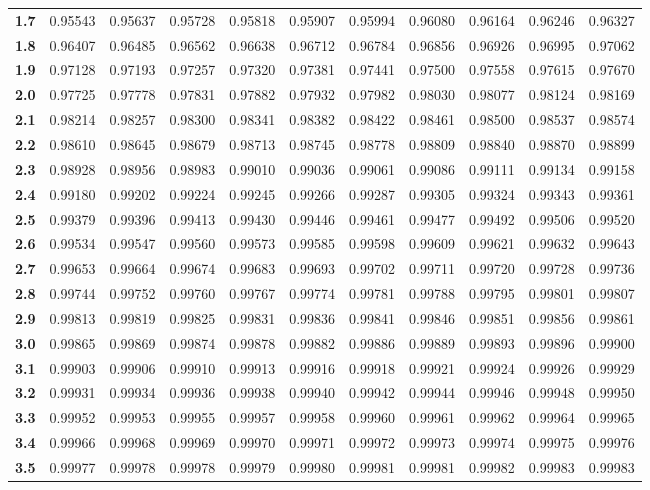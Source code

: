 \documentclass[12pt,a4paper]{article}
\begin{document}
\begin{enumerate}
\begin{center}
\begin{longtable}{c | cccccccccc}
\textbf{1.7} & 0.95543 & 0.95637 & 0.95728 & 0.95818 & 0.95907 & 0.95994 & 0.96080 & 0.96164 & 0.96246 & 0.96327 \\
\textbf{1.8} & 0.96407 & 0.96485 & 0.96562 & 0.96638 & 0.96712 & 0.96784 & 0.96856 & 0.96926 & 0.96995 & 0.97062 \\
\textbf{1.9} & 0.97128 & 0.97193 & 0.97257 & 0.97320 & 0.97381 & 0.97441 & 0.97500 & 0.97558 & 0.97615 & 0.97670 \\
\textbf{2.0} & 0.97725 & 0.97778 & 0.97831 & 0.97882 & 0.97932 & 0.97982 & 0.98030 & 0.98077 & 0.98124 & 0.98169 \\
\textbf{2.1} & 0.98214 & 0.98257 & 0.98300 & 0.98341 & 0.98382 & 0.98422 & 0.98461 & 0.98500 & 0.98537 & 0.98574 \\
\textbf{2.2} & 0.98610 & 0.98645 & 0.98679 & 0.98713 & 0.98745 & 0.98778 & 0.98809 & 0.98840 & 0.98870 & 0.98899 \\
\textbf{2.3} & 0.98928 & 0.98956 & 0.98983 & 0.99010 & 0.99036 & 0.99061 & 0.99086 & 0.99111 & 0.99134 & 0.99158 \\
\textbf{2.4} & 0.99180 & 0.99202 & 0.99224 & 0.99245 & 0.99266 & 0.99287 & 0.99305 & 0.99324 & 0.99343 & 0.99361 \\
\textbf{2.5} & 0.99379 & 0.99396 & 0.99413 & 0.99430 & 0.99446 & 0.99461 & 0.99477 & 0.99492 & 0.99506 & 0.99520 \\
\textbf{2.6} & 0.99534 & 0.99547 & 0.99560 & 0.99573 & 0.99585 & 0.99598 & 0.99609 & 0.99621 & 0.99632 & 0.99643 \\
\textbf{2.7} & 0.99653 & 0.99664 & 0.99674 & 0.99683 & 0.99693 & 0.99702 & 0.99711 & 0.99720 & 0.99728 & 0.99736 \\
\textbf{2.8} & 0.99744 & 0.99752 & 0.99760 & 0.99767 & 0.99774 & 0.99781 & 0.99788 & 0.99795 & 0.99801 & 0.99807 \\
\textbf{2.9} & 0.99813 & 0.99819 & 0.99825 & 0.99831 & 0.99836 & 0.99841 & 0.99846 & 0.99851 & 0.99856 & 0.99861 \\
\textbf{3.0} & 0.99865 & 0.99869 & 0.99874 & 0.99878 & 0.99882 & 0.99886 & 0.99889 & 0.99893 & 0.99896 & 0.99900 \\
\textbf{3.1} & 0.99903 & 0.99906 & 0.99910 & 0.99913 & 0.99916 & 0.99918 & 0.99921 & 0.99924 & 0.99926 & 0.99929 \\
\textbf{3.2} & 0.99931 & 0.99934 & 0.99936 & 0.99938 & 0.99940 & 0.99942 & 0.99944 & 0.99946 & 0.99948 & 0.99950 \\
\textbf{3.3} & 0.99952 & 0.99953 & 0.99955 & 0.99957 & 0.99958 & 0.99960 & 0.99961 & 0.99962 & 0.99964 & 0.99965 \\
\textbf{3.4} & 0.99966 & 0.99968 & 0.99969 & 0.99970 & 0.99971 & 0.99972 & 0.99973 & 0.99974 & 0.99975 & 0.99976 \\
\textbf{3.5} & 0.99977 & 0.99978 & 0.99978 & 0.99979 & 0.99980 & 0.99981 & 0.99981 & 0.99982 & 0.99983 & 0.99983 \\
\end{longtable}
\end{center}



\end{enumerate}
\end{document}
